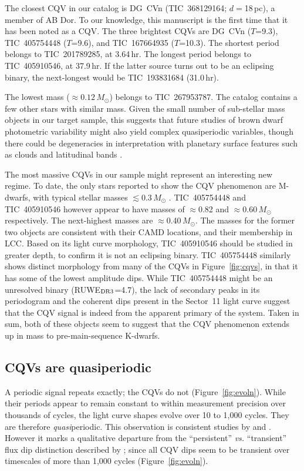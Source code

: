 \documentclass[11pt,twocolumn,tighten]{aastex63}
\begin{document}
The closest CQV in our catalog is DG~CVn (TIC~368129164;
$d$$=$18\,pc), a member of AB Dor.  To our knowledge, this manuscript
is the first time that it has been noted as a CQV.  The three
brightest CQVs are DG~CVn ($T$=9.3), TIC~405754448 ($T$=9.6), and
TIC~167664935 ($T$=10.3).  The shortest period belongs to
TIC~201789285, at 3.64\,hr.  The longest period belongs to
TIC~405910546, at 37.9\,hr.  If the latter source turns out to be an
eclipsing binary, the next-longest would be TIC~193831684 (31.0\,hr).

The lowest mass ($\approx 0.12$\,$M_\odot$) belongs to TIC~267953787.
The catalog contains a few other stars with similar mass.  Given the
small number of sub-stellar mass objects in our target sample, this
suggests that future studies of brown dwarf photometric variability
might also yield complex quasiperiodic variables, though there could
be degeneracies in interpretation with planetary surface features such
as clouds and latitudinal bands
\citep[e.g.][]{2021ApJ...906...64A,2022ApJ...924...68V}.

The most massive CQVs in our sample might represent an interesting new
regime.  To date, the only stars reported to show the CQV phenomenon
are M-dwarfs, with typical stellar masses $\lesssim$0.3\,$M_\odot$
\citep{2022AJ....163..144G}.  TIC~405754448 and TIC~405910546 however
appear to have masses of $\approx$0.82 and $\approx$0.60\,$M_\odot$
respectively.  The next-highest masses are $\approx$0.40\,$M_\odot$.
The masses for the former two objects are consistent with their CAMD
locations, and their membership in LCC.  Based on its light curve
morphology, TIC~405910546 should be studied in greater depth, to
confirm it is not an eclipsing binary.  TIC~405754448 similarly shows
distinct morphology from many of the CQVs in Figure~\ref{fig:cqvs}, in
that it has some of the lowest amplitude dips.  While TIC~405754448
might be an unresolved binary (RUWE$_{\rm DR3}$=4.7),  the lack of
secondary peaks in its periodogram and the coherent dips present in
the Sector~11 light curve suggest that the CQV signal is indeed from
the apparent primary of the system.  Taken in sum, both of these
objects seem to suggest that the CQV phenomenon extends up in mass to
pre-main-sequence K-dwarfs.


\subsection{CQVs are quasiperiodic}
A periodic signal repeats exactly; the CQVs do not
(Figure~\ref{fig:evoln}).  While their periods appear to remain
constant to within measurement precision over thousands of cycles, the
light curve shapes evolve over 10 to 1{,}000 cycles.
They are therefore {\it quasi}periodic.  This observation is consistent
studies by \citet{2022AJ....163..144G} and
\citet{2023ApJ...945..114P}.  However it marks a qualitative departure
from the ``persistent'' {\it vs.} ``transient'' flux dip distinction
described by \citet{2017AJ....153..152S};  since all CQV dips seem to
be transient over timescales of more than 1{,}000 cycles
(Figure~\ref{fig:evoln}).
\end{document}
